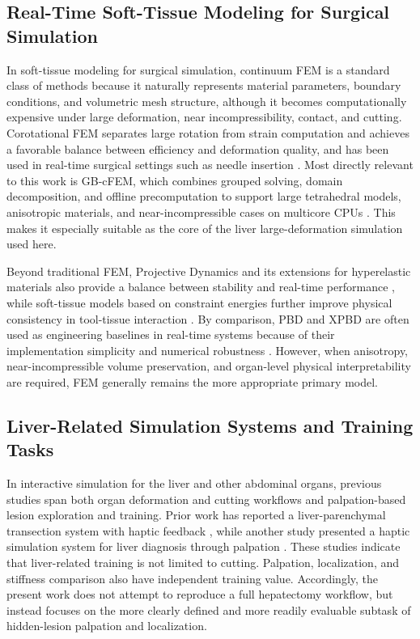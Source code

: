 \documentclass{ieeeaccess}
\begin{document}
\subsection{Real-Time Soft-Tissue Modeling for Surgical Simulation}
In soft-tissue modeling for surgical simulation, continuum FEM is a standard class of methods because it naturally represents material parameters, boundary conditions, and volumetric mesh structure, although it becomes computationally expensive under large deformation, near incompressibility, contact, and cutting. Corotational FEM separates large rotation from strain computation and achieves a favorable balance between efficiency and deformation quality, and has been used in real-time surgical settings such as needle insertion \cite{bui2019corotational}. Most directly relevant to this work is GB-cFEM, which combines grouped solving, domain decomposition, and offline precomputation to support large tetrahedral models, anisotropic materials, and near-incompressible cases on multicore CPUs \cite{wang2025group}. This makes it especially suitable as the core of the liver large-deformation simulation used here.

Beyond traditional FEM, Projective Dynamics and its extensions for hyperelastic materials also provide a balance between stability and real-time performance \cite{bouaziz2023projective,liu2016towards}, while soft-tissue models based on constraint energies further improve physical consistency in tool-tissue interaction \cite{hou2019new}. By comparison, PBD and XPBD are often used as engineering baselines in real-time systems because of their implementation simplicity and numerical robustness \cite{bender2014survey,muller2007position,macklin2016xpbd}. However, when anisotropy, near-incompressible volume preservation, and organ-level physical interpretability are required, FEM generally remains the more appropriate primary model.

\subsection{Liver-Related Simulation Systems and Training Tasks}
In interactive simulation for the liver and other abdominal organs, previous studies span both organ deformation and cutting workflows and palpation-based lesion exploration and training. Prior work has reported a liver-parenchymal transection system with haptic feedback \cite{hongyu2021interactive}, while another study presented a haptic simulation system for liver diagnosis through palpation \cite{westwood2012haptic}. These studies indicate that liver-related training is not limited to cutting. Palpation, localization, and stiffness comparison also have independent training value. Accordingly, the present work does not attempt to reproduce a full hepatectomy workflow, but instead focuses on the more clearly defined and more readily evaluable subtask of hidden-lesion palpation and localization.
\end{document}
